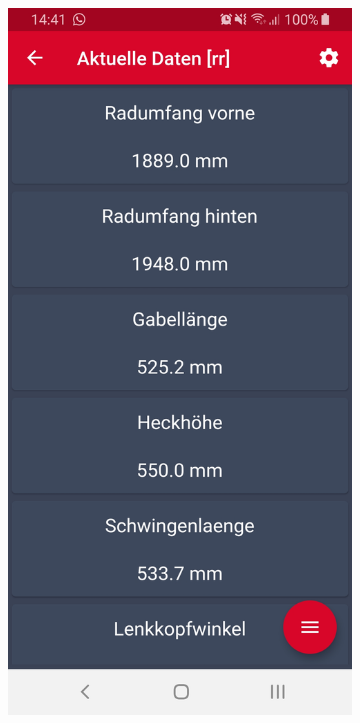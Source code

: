 	\begin{figure}[H]
		\centering
		\begin{subfigure}[b]{0.45\textwidth}
			\centering
			\includegraphics[width=1\textwidth]{../include/images/usertests/threepointmenu/before}

\end{subfigure}
\end{figure}
